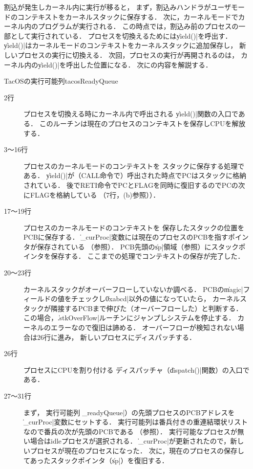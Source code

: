 割込が発生しカーネル内に実行が移ると，
まず，割込みハンドラがユーザモードのコンテキストをカーネルスタックに保存する．
次に，カーネルモードでカーネル内のプログラムが実行される．
この時点では，割込み前のプロセスの一部として実行されている．
プロセスを切換えるためには\|yield()|を呼出す．
\|yield()|はカーネルモードのコンテキストをカーネルスタックに追加保存し，
新しいプロセスの実行に切換える．
次回，プロセスの実行が再開されるのは，
カーネル内の\|yield()|を呼出した位置になる．
次にの内容を解説する．

{TacOSの実行可能列}{tacosReadyQueue}

\begin{description}
\item[2行] プロセスを切換える時にカーネル内で呼出される
\|yield()|関数の入口である．
このルーチンは現在のプロセスのコンテキストを保存しCPUを解放する．

\item[3〜16行] プロセスのカーネルモードのコンテキストを
スタックに保存する処理である．
\|yield()|が（CALL命令で）呼出された時点でPCはスタックに格納されている．
後でRETI命令でPCとFLAGを同時に復旧するのでPCの次にFLAGを格納している
（7行，(b)参照））．

\item[17〜19行] プロセスのカーネルモードのコンテキストを
保存したスタックの位置をPCBに保存する．
\|_curProc|変数には現在のプロセスのPCBを指すポインタが保存されている
（参照）．
PCB先頭の\|sp|領域（参照）にスタックポインタを保存する．
ここまでの処理でコンテキストの保存が完了した．

\item[20〜23行] カーネルスタックがオーバーフローしていないか調べる．
PCBの\|magic|フィールドの値をチェックし\|0xabcd|以外の値になっていたら，
カーネルスタックが隣接するPCBまで伸びた（オーバーフローした）と判断する．
この場合，\|.stkOverFlow|ルーチンにジャンプしシステムを停止する．
カーネルのエラーなので復旧は諦める．
オーバーフローが検知されない場合は26行に進み，
新しいプロセスにディスパッチする．

\item[26行] プロセスにCPUを割り付ける
ディスパッチャ（\|dispatch()|関数）の入口である．

\item[27〜31行] まず，
実行可能列（\|_readyQueue|）の先頭プロセスのPCBアドレスを
\|_curProc|変数にセットする．
実行可能列は番兵付きの重連結環状リストなので番兵の次が先頭のPCBである
（参照）．
実行可能なプロセスが無い場合はidleプロセスが選択される．
\|_curProc|が更新されたので，新しいプロセスが現在のプロセスになった．
次に，現在のプロセスの保存してあったスタックポインタ（\|sp|）を復旧する．


\end{description}

